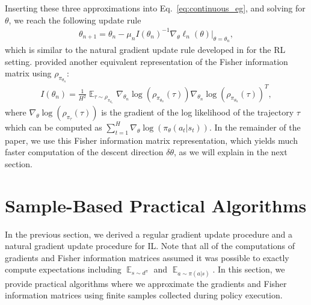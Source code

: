 \documentclass{article}
\newcommand{\BB}[1]{\textcolor{red}{\bf Byron: {#1}}}
\begin{document}
Inserting these three approximations into Eq.~\ref{eq:continuous_eg}, and solving for $\theta$, we reach the following update rule
\begin{align}
\theta_{n+1} = \theta_n - \mu_{n}I(\theta_n)^{-1}\nabla_{\theta}\ell_n(\theta)|_{\theta =\theta_n},
\end{align} which is similar to the natural gradient update rule developed in \cite{kakade2002natural} %
for the RL setting. 
\citet{bagnell2003covariant} provided another equivalent representation of the Fisher information matrix using $\rho_{\pi_{\theta_n}}$:
\begin{align}
\label{eq:fisher_traj}
I(\theta_n) = \frac{1}{H^2}\mathop{\mathop{\mathbb{E}}}_{\tau\sim \rho_{\pi_{\theta_n}}}\nabla_{\theta_n}\log(\rho_{\pi_{\theta_n}}(\tau))\nabla_{\theta_n}\log(\rho_{\pi_{\theta_n}}(\tau))^T,
\end{align} where $\nabla_{\theta}\log(\rho_{\pi_{\tau}}(\tau))$ is the gradient of the log likelihood of the trajectory $\tau$ which can be computed as $\sum_{t=1}^H\nabla_{\theta}\log(\pi_{\theta}(a_t|s_t))$. In the remainder of the paper, we use this Fisher information matrix representation, which yields much faster computation of the descent direction $\delta\theta$, as we will explain in the next section.





\section{Sample-Based Practical Algorithms}
In the previous section, we derived a regular gradient update procedure and a natural gradient update procedure for IL. Note that all of the computations of gradients and Fisher information matrices assumed it was possible to exactly compute expectations including $\mathop{\mathbb{E}}_{s\sim d^{\pi}}$ and $\mathop{\mathbb{E}}_{a\sim \pi(a|s)}$. In this section, we provide practical algorithms where we approximate the gradients and Fisher information matrices using finite samples collected during policy execution. 
\end{document}
